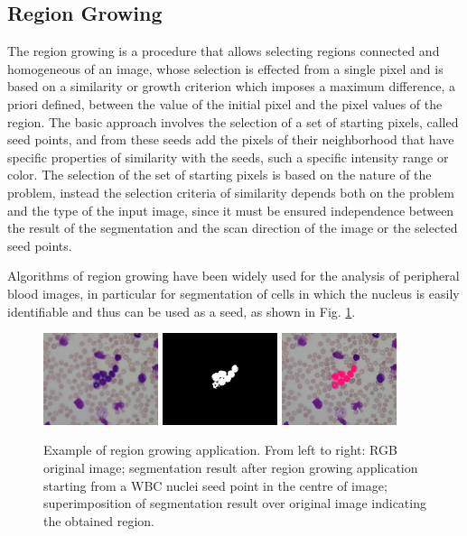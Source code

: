 \subsection{Region Growing} 
The region growing is a procedure that allows selecting regions connected and homogeneous of an image, whose selection is effected from a single pixel and is based on a similarity or growth criterion which imposes a maximum difference, a priori defined, between the value of the initial pixel and the pixel values of the region. The basic approach involves the selection of a set of starting pixels, called seed points, and from these seeds add the pixels of their neighborhood that have specific properties of similarity with the seeds, such a specific intensity range or color. The selection of the set of starting pixels is based on the nature of the problem, instead the selection criteria of similarity depends both on the problem and the type of the input image, since it must be ensured independence between the result of the segmentation and the scan direction of the image or the selected seed points. 

Algorithms of region growing have been widely used for the analysis of peripheral blood images, in particular for segmentation of cells in which the nucleus is easily identifiable and thus can be used as a seed, as shown in Fig. \ref{fig:regionGrowing}. 

\begin{figure}[h]
	\centering
	\includegraphics[width=0.3\textwidth]{images/figcs_rgb}
	\includegraphics[width=0.3\textwidth]{images/fig_regionGrowing}
	\includegraphics[width=0.3\textwidth]{images/fig_regionGrowing2}
	\caption[Example of region growing.]{\label{fig:regionGrowing}Example of region growing application. From left to right: RGB original image; segmentation result after region growing application starting from a WBC nuclei seed point in the centre of image; superimposition of segmentation result over original image indicating the obtained region.}
\end{figure}


